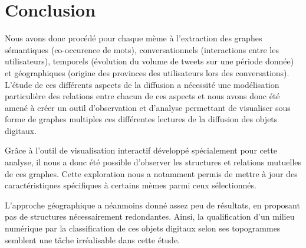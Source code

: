 \chapter*{Conclusion}



Nous avons donc procédé pour chaque mème à l{\textquoteright}extraction des graphes sémantiques (co-occurence de mots), conversationnels (interactions entre les utilisateurs), temporels (évolution du volume de tweets sur une période donnée) et géographiques (origine des provinces des utilisateurs lors des conversations). L{\textquoteright}étude de ces différents aspects de la diffusion a nécessité une modélisation particulière des relations entre chacun de ces aspects et nous avons donc été amené à créer un outil d{\textquoteright}observation et d{\textquoteright}analyse permettant de visualiser sous forme de graphes multiples ces différentes lectures de la diffusion des objets digitaux.  


Gr\^ace à l{\textquoteright}outil de visualisation interactif développé spécialement pour cette analyse, il nous a donc été possible d{\textquoteright}observer les structures et relations mutuelles de ces graphes. Cette exploration nous a notamment permis de mettre à jour des caractéristiques spécifiques à certains mèmes parmi ceux sélectionnés.


L{\textquoteright}approche géographique a néanmoins donné assez peu de résultats, en proposant pas de structures nécessairement redondantes. Ainsi, la qualification d{\textquoteright}un milieu numérique par la classification de ces objets digitaux selon ses topogrammes semblent une t\^ache irréalisable dans cette étude. 


\lipsum[4-10]